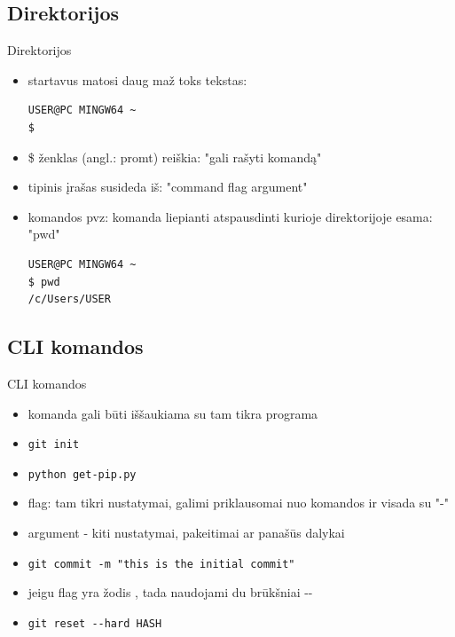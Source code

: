 \documentclass[11pt,xcolor=table]{beamer}
\begin{document}
\subsection{Direktorijos}

\begin{frame}[fragile]{Direktorijos}
\begin{itemize}
\item startavus matosi daug maž toks tekstas:

\begin{lstlisting}
USER@PC MINGW64 ~
$ 
\end{lstlisting}

\item \$ ženklas (angl.: promt) reiškia: "gali rašyti komandą"
\item tipinis įrašas susideda iš: "command flag argument"
\item komandos pvz: komanda liepianti atspausdinti kurioje direktorijoje esama: "pwd"

\begin{lstlisting}
USER@PC MINGW64 ~
$ pwd
/c/Users/USER
\end{lstlisting}

\end{itemize}
\end{frame}


\subsection{CLI komandos}
\begin{frame}[fragile]{CLI komandos}
\begin{itemize}
\item komanda gali būti iššaukiama su tam tikra programa
\item \colorbox{listinggray}{\lstinline|git init|}
\item \colorbox{listinggray}{\lstinline|python get-pip.py|}
\item flag: tam tikri nustatymai, galimi priklausomai nuo komandos ir visada su "-"
\item argument - kiti nustatymai, pakeitimai ar panašūs dalykai
\item \colorbox{listinggray}{\lstinline|git commit -m "this is the initial commit"|}
\item jeigu flag yra žodis , tada naudojami du brūkšniai -\/- 
\item \colorbox{listinggray}{\lstinline|git reset --hard HASH|}

\end{itemize}
\end{frame}
\end{document}
